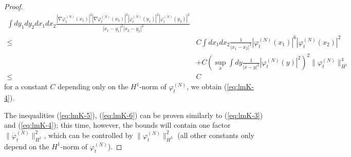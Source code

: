 \documentclass[11pt,a4paper]{article}
\begin{document}
\begin{proof}
\[\begin{split}
\int dy_1 dy_2 dx_1 dx_2  \frac{ |\nabla\varphi_t^{(N)} (x_1)|^2 |\nabla \varphi_t^{(N)} (x_2)|^2 
|\varphi_t^{(N)} (y_1)|^2 |\varphi_t^{(N)} (y_2)|^2}{|x_1 - y_1|^2 |x_2 - y_2|^2}  \\ \leq \; &C \int dx_1 dx_2 \frac{1}{|x_1 - x_2|^2} |\varphi_t^{(N)} (x_1)|^6 |\varphi_t^{(N)} (x_2)|^2 \\ &+ C \left( \sup_x \int dy \frac{1}{|x-y|^2} |\varphi_t^{(N)} (y)|^2 \right)^2 \| \varphi_t^{(N)} \|_{H^1}^4 \\ \leq \; & C 
\end{split} \]
for a constant $C$ depending only on the $H^1$-norm of $\varphi_t^{(N)}$, we obtain (\ref{eq:lmK-4}). 

The inequalities (\ref{eq:lmK-5}), (\ref{eq:lmK-6}) can be proven similarly to (\ref{eq:lmK-3}) and (\ref{eq:lmK-4}); this time, however, the bounds will contain one factor $\| \dot{\varphi}_t^{(N)} \|^2_{H^1}$, which can be controlled by $\| \varphi_t^{(N)} \|^2_{H^3}$ (all other constants only depend on the $H^1$-norm of $\varphi_t^{(N)}$).
\end{proof}
\end{document}
